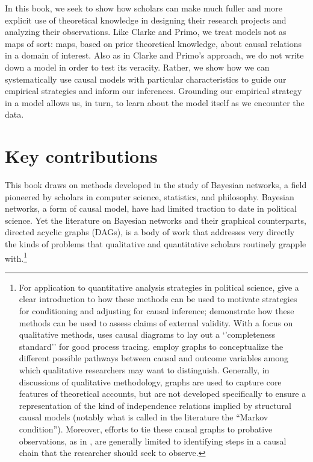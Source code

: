 \documentclass[12pt,]{book}
\let\rmarkdownfootnote\footnote%
\def\footnote{\protect\rmarkdownfootnote}
\begin{document}
In this book, we seek to show how scholars can make much fuller and more explicit use of theoretical knowledge in designing their research projects and analyzing their observations. Like Clarke and Primo, we treat models not as maps of sort: maps, based on prior theoretical knowledge, about causal relations in a domain of interest. Also as in Clarke and Primo's approach, we do not write down a model in order to test its veracity. Rather, we show how we can systematically use causal models with particular characteristics to guide our empirical strategies and inform our inferences. Grounding our empirical strategy in a model allows us, in turn, to learn about the model itself as we encounter the data.

\hypertarget{key-contributions}{%
\section{Key contributions}\label{key-contributions}}

This book draws on methods developed in the study of Bayesian networks, a field pioneered by scholars in computer science, statistics, and philosophy. Bayesian networks, a form of causal model, have had limited traction to date in political science. Yet the literature on Bayesian networks and their graphical counterparts, directed acyclic graphs (DAGs), is a body of work that addresses very directly the kinds of problems that qualitative and quantitative scholars routinely grapple with.\footnote{For application to quantitative analysis strategies in political science, \citet{glynn2007non} give a clear introduction to how these methods can be used to motivate strategies for conditioning and adjusting for causal inference; \citet{garcia2015graphical} demonstrate how these methods can be used to assess claims of external validity. With a focus on qualitative methods, \citet{Waldner2015completeness} uses causal diagrams to lay out a `'completeness standard'' for good process tracing. \citet{weller2014finding} employ graphs to conceptualize the different possible pathways between causal and outcome variables among which qualitative researchers may want to distinguish. Generally, in discussions of qualitative methodology, graphs are used to capture core features of theoretical accounts, but are not developed specifically to ensure a representation of the kind of independence relations implied by structural causal models (notably what is called in the literature the ``Markov condition''). Moreover, efforts to tie these causal graphs to probative observations, as in \citet{Waldner2015completeness}, are generally limited to identifying steps in a causal chain that the researcher should seek to observe.}
\end{document}

